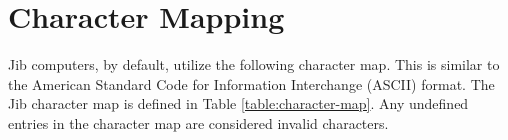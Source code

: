 \documentclass{article}
\begin{document}
\pagebreak

\section{Character Mapping}
\label{sec:character-map}

Jib computers, by default, utilize the following character map. This is similar to the American Standard Code for Information Interchange (ASCII) format. The Jib character map is defined in Table \ref{table:character-map}. Any undefined entries in the character map are considered invalid characters.

\newcommand{\charmap}[1]{\texttt{#1}}

\newcommand{\charslash}{\texttt{\char`\\}}

\newcommand{\charmapescape}[1]{\charmap{\texttt{\charslash#1}}}
\end{document}
